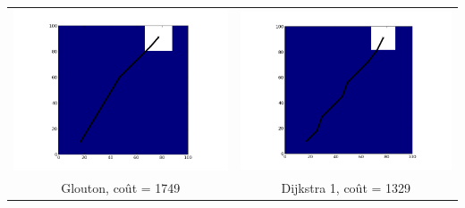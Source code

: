 \begin{table}
\begin{tabular}{cc}
\includegraphics[scale=0.42]{../data/greedy_const/plot_A_10_17_B_91_77_iteration_010.png} &
\includegraphics[scale=0.42]{../data/anneaux_const/plot_A_10_17_B_91_77_iteration_009.png} \\
Glouton, coût = 1749&Dijkstra 1, coût = 1329\\

\end{tabular}
\end{table}
